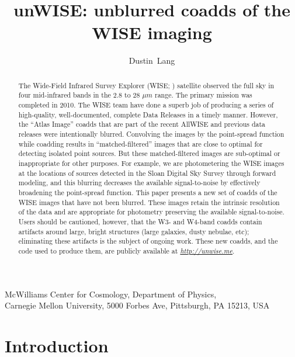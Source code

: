 \documentclass[11pt,preprint]{aastex}
\newcommand{\niceurl}[1]{\href{#1}{\textsl{#1}}}
\begin{document}
\title{unWISE: unblurred coadds of the WISE imaging}
\author{Dustin~Lang}
\affil%
{McWilliams Center for Cosmology,
  Department of Physics, \\ Carnegie Mellon University,
  5000 Forbes Ave, Pittsburgh, PA 15213, USA}
\date{}

\begin{abstract}
The Wide-Field Infrared Survey Explorer (WISE; \citealt{wright})
satellite observed the full sky in four mid-infrared bands in the
$2.8$ to $28$ $\mu m$ range.  The primary mission was completed in
2010.  The WISE team have done a superb job of producing a series of
high-quality, well-documented, complete Data Releases in a timely
manner.  However, the ``Atlas Image'' coadds that are part of the
recent AllWISE and previous data releases were intentionally blurred.
Convolving the images by the point-spread function while coadding
results in ``matched-filtered'' images that are close to optimal for
detecting isolated point sources.  But these matched-filtered images
are sub-optimal or inappropriate for other purposes.  For
example, we are photometering the WISE images at the locations of
sources detected in the Sloan Digital Sky Survey \citep{york} through
forward modeling, and this blurring decreases the available
signal-to-noise by effectively broadening the point-spread function.
This paper presents a new set of coadds of the WISE images that have not been
blurred.  These images retain the intrinsic resolution of the data and
are appropriate for photometry preserving the available
signal-to-noise.
%
Users should be cautioned, however, that the W3- and W4-band coadds contain
artifacts around large, bright structures (large galaxies, dusty
nebulae, etc); eliminating these artifacts is the subject of ongoing
work.
%
These new coadds, and the code used to produce them, are publicly
available at \niceurl{http://unwise.me}.
\end{abstract}


\section{Introduction}
\end{document}
